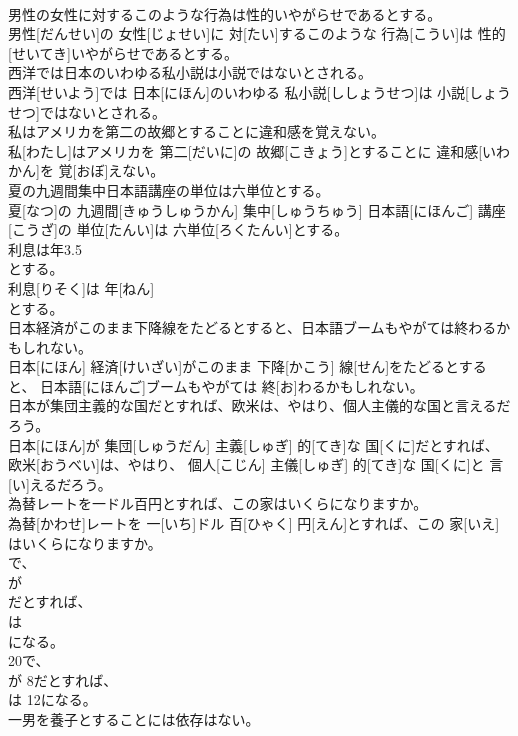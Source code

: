 \documentclass[8pt]{extreport}
\begin{document}
\begin{CJK}{UTF8}{min}
\\	男性の女性に対するこのような行為は性的いやがらせであるとする。	
\\	男性[だんせい]の 女性[じょせい]に 対[たい]するこのような 行為[こうい]は 性的[せいてき]いやがらせであるとする。
\\	西洋では日本のいわゆる私小説は小説ではないとされる。	
\\	西洋[せいよう]では 日本[にほん]のいわゆる 私小説[ししょうせつ]は 小説[しょうせつ]ではないとされる。
\\	私はアメリカを第二の故郷とすることに違和感を覚えない。	
\\	私[わたし]はアメリカを 第二[だいに]の 故郷[こきょう]とすることに 違和感[いわかん]を 覚[おぼ]えない。
\\	夏の九週間集中日本語講座の単位は六単位とする。	
\\	夏[なつ]の 九週間[きゅうしゅうかん] 集中[しゅうちゅう] 日本語[にほんご] 講座[こうざ]の 単位[たんい]は 六単位[ろくたんい]とする。
\\	利息は年3.5
\\	とする。	
\\	利息[りそく]は 年[ねん] 
\\	とする。
\\	日本経済がこのまま下降線をたどるとすると、日本語ブームもやがては終わるかもしれない。	
\\	日本[にほん] 経済[けいざい]がこのまま 下降[かこう] 線[せん]をたどるとすると、 日本語[にほんご]ブームもやがては 終[お]わるかもしれない。
\\	日本が集団主義的な国だとすれば、欧米は、やはり、個人主儀的な国と言えるだろう。	
\\	日本[にほん]が 集団[しゅうだん] 主義[しゅぎ] 的[てき]な 国[くに]だとすれば、 欧米[おうべい]は、やはり、 個人[こじん] 主儀[しゅぎ] 的[てき]な 国[くに]と 言[い]えるだろう。
\\	為替レートを一ドル百円とすれば、この家はいくらになりますか。	
\\	為替[かわせ]レートを 一[いち]ドル 百[ひゃく] 円[えん]とすれば、この 家[いえ]はいくらになりますか。
\\	で、
\\	が 
\\	だとすれば、
\\	は 
\\	になる。	
\\	20で、 
\\	が 8だとすれば、 
\\	は 12になる。
\\	一男を養子とすることには依存はない。	

\end{CJK}
\end{document}
